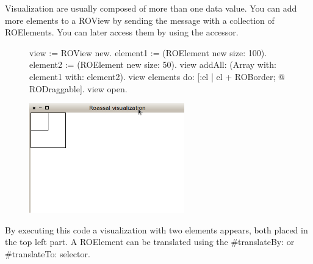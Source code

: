 \documentclass[a4paper,10pt,twoside]{book}
\begin{document}
Visualization are usually composed of more than one data value. You can add more elements to a ROView by sending the message  with a collection of ROElements. You can later access them by using the  accessor. 

\begin{figure}[H]
      \begin{minipage}[t]{0.5\textwidth}
      \vspace{0pt}
\begin{code}{}
view := ROView new.
element1 := (ROElement new size: 100).
element2 := (ROElement new size: 50).
view addAll: (Array with: element1 with: element2).
view elements do: [:el | el + ROBorder; @ RODraggable].
view open.
\end{code}
   \end{minipage}
   \hfill
   \begin{minipage}[t]{0.6\textwidth}
      \vspace{0pt} \raggedright
       \centering
		\includegraphics[width=0.6\textwidth]{ex3}
   \end{minipage}
\label{fig:ex3}
\end{figure}

By executing this code a visualization with two elements appears, both placed in the top left part. A ROElement can be translated using the \#translateBy: or \#translateTo: selector.
\end{document}
